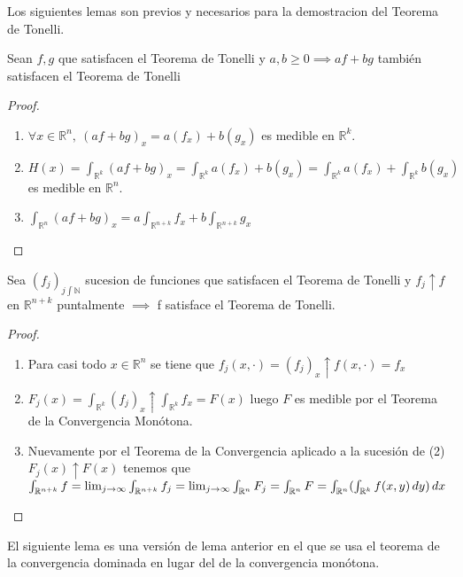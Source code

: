 \begin{observación}
Los siguientes lemas son previos y necesarios para la demostracion del Teorema de Tonelli.
\end{observación}

\begin{lema}
    Sean $f,g$ que satisfacen el Teorema de Tonelli y $a, b \geq 0 \implies af + bg$ también satisfacen el Teorema de Tonelli\label{lema1Tonelli}
\end{lema}

\begin{proof}
    \leavevmode
    \begin{enumerate}
        \item $\forall x \in \mathbb{R}^n, \ (af + bg)_x = a(f_x) + b(g_x)$ es medible en $\mathbb{R}^k$.
        \item $H(x) = \int_{\mathbb{R}^k}(af + bg)_x = \int_{\mathbb{R}^k}a(f_x) + b(g_x) = \int_{\mathbb{R}^k}a(f_x) + \int_{\mathbb{R}^k}b(g_x)$ es medible en $\mathbb{R}^n$.
        \item $\int_{\mathbb{R}^{n}}(af +bg)_x = a\int_{\mathbb{R}^{n+k}}f_x + b \int_{\mathbb{R}^{n+k}}g_x$
    \end{enumerate}
\end{proof}

\begin{lema}
    Sea $(f_j)_{j\int\mathbb{N}}$ sucesion de funciones que satisfacen el Teorema de Tonelli y $f_j \uparrow f$ en $\mathbb{R}^{n+k}$ puntalmente $\implies$ f satisface el Teorema de Tonelli.\label{lema2Tonelli}
\end{lema}
\begin{proof}
    \leavevmode
    \begin{enumerate}
        \item Para casi todo $x \in \mathbb{R}^{n}$ se tiene que $f_j(x, \cdot) = (f_j)_x
                  \uparrow f(x, \cdot) = f_x$
        \item $F_j(x) = \int_{\mathbb{R}^k}(f_j)_x \uparrow \int_{\mathbb{R}^k}f_x = F(x)$ luego $F$ es medible por el Teorema de la Convergencia Monótona.
        \item Nuevamente por el Teorema de la Convergencia aplicado a la sucesión de (2)
              $F_j(x) \uparrow F(x)$ tenemos que $\int_{\mathbb{R}^{n+k}}f = \lim_{j \to
                      \infty} \int_{\mathbb{R}^{n+k}} f_j = \lim_{j \to \infty}\int_{\mathbb{R}^n}F_j =
                  \int_{\mathbb{R}^n}F = \int_{\mathbb{R}^n}(\int_{\mathbb{R}^k}f(x,y) \,dy)\,dx$
    \end{enumerate}
\end{proof}
\begin{observación}
El siguiente lema es una versión de lema anterior en el que se usa el teorema de la convergencia dominada en lugar del de la convergencia monótona.
\end{observación}

